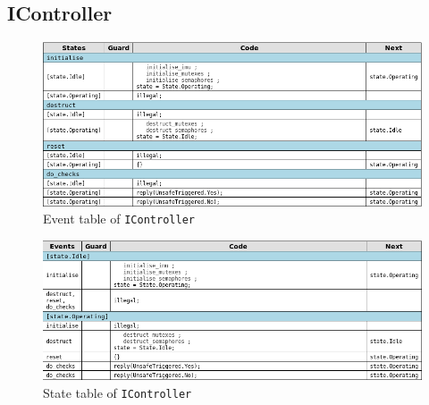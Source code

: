 \documentclass[12pt]{scrreprt}
\begin{document}
\begin{appendices}
\section{IController}
\label{IController}

\begin{figure}[H]
    \centering
    \includegraphics[width=\textwidth]{Figures/results/modelling_figures/IController/IController_event_table.png}
    \caption{Event table of \texttt{IController}}
    \label{fig:IController_event_table}
\end{figure}

\begin{figure}[H]
    \centering
    \includegraphics[width=\textwidth]{Figures/results/modelling_figures/IController/IController_state_table.png}
    \caption{State table of \texttt{IController}}
    \label{fig:IController_state_table}
\end{figure}


\end{appendices}
\end{document}
